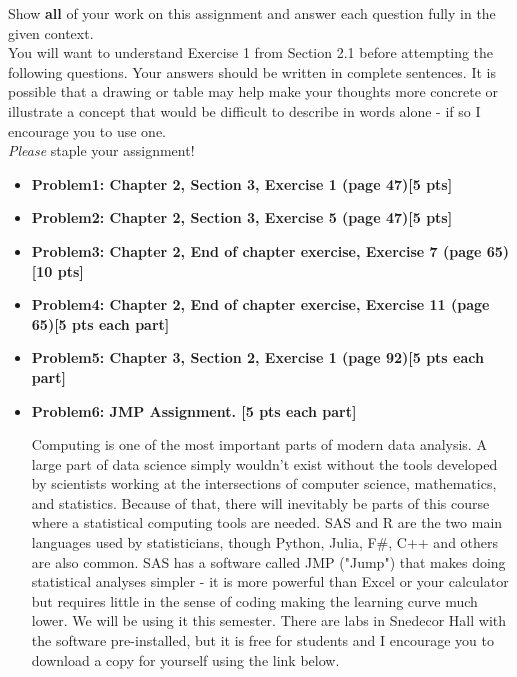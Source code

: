 \documentclass[11pt]{article}\usepackage[]{graphicx}\usepackage[]{color}
\begin{document}
\pagestyle{fancy} 

Show \textbf{all} of your work on this assignment and answer each question fully in the given context. \\
You will want to understand Exercise 1 from Section 2.1 before attempting the following questions.  
Your answers should be written in complete sentences.
It is possible that a drawing or table may help make your thoughts more concrete or illustrate a concept that would be difficult to describe in words alone - if so I encourage you to use one.\\

\emph{Please} staple your assignment!

\begin{itemize}

\item \textbf{Problem1: Chapter 2, Section 3, Exercise 1 (page 47)[5 pts]} \\

\item \textbf{Problem2: Chapter 2, Section 3, Exercise 5 (page 47)[5 pts]}\\


\item \textbf{Problem3: Chapter 2, End of chapter exercise, Exercise 7 (page 65)[10 pts]}\\

\item \textbf{Problem4: Chapter 2, End of chapter exercise, Exercise 11 (page 65)[5 pts each part]}\\
\item \textbf{Problem5: Chapter 3, Section 2,  Exercise 1 (page 92)[5 pts each part]}\\

\item \textbf{Problem6: JMP Assignment. [5 pts each part]} 

   Computing is one of the most important parts of modern data analysis. A large part of data science simply wouldn't exist without the tools developed by scientists working at the intersections of computer science, mathematics, and statistics. 
   Because of that, there will inevitably be parts of this course where a statistical computing tools are needed. SAS and R are the two main languages used by statisticians, though Python, Julia, F\#, C++ and others are also common.
   SAS has a software called JMP ("Jump") that makes doing statistical analyses simpler - it is more powerful than Excel or your calculator but requires little in the sense of coding making the learning curve much lower. 
   We will be using it this semester. There are labs in Snedecor Hall with the software pre-installed, but it is free for students and I encourage you to download a copy for yourself using the link below.


\end{itemize}
\end{document}
